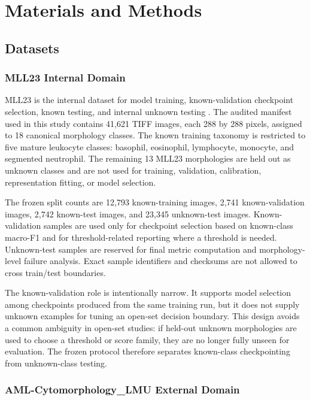 \section{Materials and Methods}

\subsection{Datasets}

\subsubsection{MLL23 Internal Domain}

MLL23 is the internal dataset for model training, known-validation checkpoint selection, known testing, and internal unknown testing \cite{mll23_nature_2025,mll23_zenodo_2024}. The audited manifest used in this study contains 41,621 TIFF images, each 288 by 288 pixels, assigned to 18 canonical morphology classes. The known training taxonomy is restricted to five mature leukocyte classes: basophil, eosinophil, lymphocyte, monocyte, and segmented neutrophil. The remaining 13 MLL23 morphologies are held out as unknown classes and are not used for training, validation, calibration, representation fitting, or model selection.

The frozen split counts are 12,793 known-training images, 2,741 known-validation images, 2,742 known-test images, and 23,345 unknown-test images. Known-validation samples are used only for checkpoint selection based on known-class macro-F1 and for threshold-related reporting where a threshold is needed. Unknown-test samples are reserved for final metric computation and morphology-level failure analysis. Exact sample identifiers and checksums are not allowed to cross train/test boundaries.

The known-validation role is intentionally narrow. It supports model selection among checkpoints produced from the same training run, but it does not supply unknown examples for tuning an open-set decision boundary. This design avoids a common ambiguity in open-set studies: if held-out unknown morphologies are used to choose a threshold or score family, they are no longer fully unseen for evaluation. The frozen protocol therefore separates known-class checkpointing from unknown-class testing.

\subsubsection{AML-Cytomorphology\_LMU External Domain}

